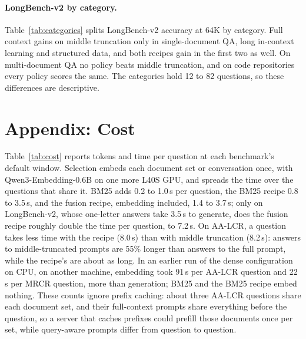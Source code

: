 \documentclass[letterpaper]{article} %
\newcommand{\recipe}{fusion recipe}
\begin{document}
\begin{table}[t]
\centering
\small

\caption{MRCR questions whose target turn the \recipe{} keeps complete, by how many of the four needle turns the prompt keeps complete: the number of questions, the recipe's exact matches and the oracle's on the same questions. At 262K, 119 of the 120 prompts keep all four.}
\label{tab:needles}
\end{table}

\paragraph{LongBench-v2 by category.} Table~\ref{tab:categories} splits LongBench-v2 accuracy at 64K by category. Full context gains on middle truncation only in single-document QA, long in-context learning and structured data, and both recipes gain in the first two as well. On multi-document QA no policy beats middle truncation, and on code repositories every policy scores the same. The categories hold 12 to 82 questions, so these differences are descriptive.

\begin{table}[t]
\centering
\small

\caption{LongBench-v2 accuracy by category at the 64K window, in percent; full context is the 262K run.}
\label{tab:categories}
\end{table}

\section{Appendix: Cost}
Table~\ref{tab:cost} reports tokens and time per question at each benchmark's default window. Selection embeds each document set or conversation once, with Qwen3-Embedding-0.6B on one more L40S GPU, and spreads the time over the questions that share it. BM25 adds 0.2 to 1.0\,s per question, the BM25 recipe 0.8 to 3.5\,s, and the \recipe{}, embedding included, 1.4 to 3.7\,s; only on LongBench-v2, whose one-letter answers take 3.5\,s to generate, does the \recipe{} roughly double the time per question, to 7.2\,s. On AA-LCR, a question takes less time with the recipe (8.0\,s) than with middle truncation (8.2\,s): answers to middle-truncated prompts are 55\% longer than answers to the full prompt, while the recipe's are about as long. In an earlier run of the dense configuration on CPU, on another machine, embedding took 91\,s per AA-LCR question and 22\,s per MRCR question, more than generation; BM25 and the BM25 recipe embed nothing. These counts ignore prefix caching: about three AA-LCR questions share each document set, and their full-context prompts share everything before the question, so a server that caches prefixes could prefill those documents once per set, while query-aware prompts differ from question to question.
\end{document}

